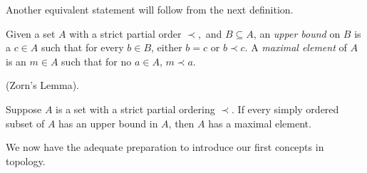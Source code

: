 Another equivalent statement will follow from the next definition.
\begin{definition}\label{1.42}
    Given a set $A$ with a strict partial order $\prec,$ and $B \subseteq A$, an {\it upper bound} on $B$ is a $c \in A$ such that for every $b \in B$, either $b = c$ or $b \prec c$. A {\it maximal element} of $A$ is an $m \in A$ such that for no $a \in A$, $m \prec a$.
\end{definition}
\begin{theorem}\label{1.43}
    (Zorn's Lemma).
    \vspace{10pt}

    Suppose $A$ is a set with a strict partial ordering $\prec.$ If every simply ordered subset of $A$ has an upper bound in $A$, then $A$ has a maximal element.
\end{theorem}
We now have the adequate preparation to introduce our first concepts in topology.